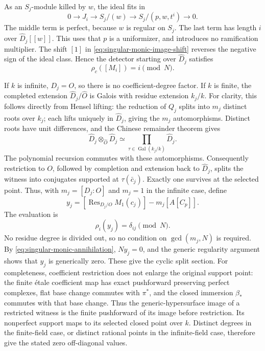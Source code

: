As an \(S_j\)-module killed by \(w\), the ideal fits in
\[
 0\longrightarrow J_i\longrightarrow S_j/(w)
      \longrightarrow S_j/(p,w,t^i)\longrightarrow0.
\]
The middle term is perfect, because \(w\) is regular on \(S_j\).
The last term has length \(i\) over \(\widehat D_j[[w]]\).
This uses that \(p\) is a uniformizer, and introduces no
ramification multiplier.  The shift \([1]\) in
\eqref{eq:singular-monic-image-shift} reverses the negative sign
of the ideal class.  Hence the detector starting over
\(\widehat D_j\) satisfies
\begin{equation}\label{eq:singular-monic-witness-values}
 \rho_c([M_i])=i\pmod N.
\end{equation}

If \(k\) is infinite, \(D_j=O\), so there is no coefficient-degree
factor.  If \(k\) is finite, the completed extension
\(\widehat D_j/\widehat O\) is Galois with residue extension
\(k_j/k\).  For clarity, this follows directly from Hensel lifting:
the reduction of \(Q_j\) splits into \(m_j\) distinct roots over
\(k_j\); each lifts uniquely in \(\widehat D_j\), giving the
\(m_j\) automorphisms.  Distinct roots have unit differences, and
the Chinese remainder theorem gives
\[
 \widehat D_j\otimes_{\widehat O}\widehat D_j
          \simeq\prod_{\tau\in\operatorname{Gal}(k_j/k)}\widehat D_j.
\]
The polynomial recursion commutes with these automorphisms.
Consequently restriction to \(O\), followed by completion and
extension back to \(\widehat D_j\), splits the witness into
conjugates supported at \(\tau(\bar c_j)\).
Exactly one survives at the selected point.  Thus, with
\(m_j=[D_j:O]\) and \(m_j=1\) in the infinite case, define
\[
 y_j=[\operatorname{Res}_{D_j/O}M_1(c_j)]-m_j[A[C_p]].
\]
The evaluation is
\begin{equation}\label{eq:singular-monic-coordinate-values}
 \rho_i(y_j)=\delta_{ij}\pmod N.
\end{equation}
No residue degree is divided out, so no condition on
\(\gcd(m_j,N)\) is required.  By
\eqref{eq:singular-monic-annihilation}, \(Ny_j=0\), and the
generic regularity argument shows that \(y_j\) is generically zero.
These give the cyclic split section.
For completeness, coefficient restriction does not enlarge the original
support point: the finite \'etale coefficient map has exact pushforward
preserving perfect complexes, flat base change commutes with \(\pi^*\),
and the closed immersion \(\beta_*\) commutes with that base change.
Thus the generic-hypersurface image of a restricted witness is the
finite pushforward of its image before restriction.  Its nonperfect
support maps to its selected closed point over \(k\).  Distinct
degrees in the finite-field case, or distinct rational points in the
infinite-field case, therefore give the stated zero off-diagonal values.

